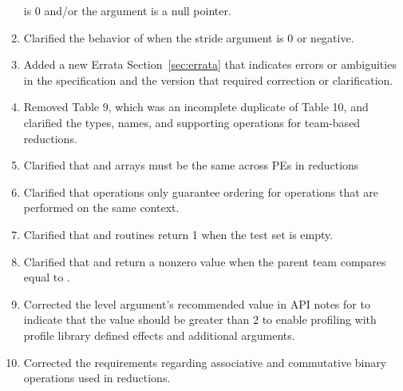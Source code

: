 \begin{enumerate}
     is 0 and/or the  argument is a null pointer.
%
\item Clarified the behavior of  when the
    stride argument is 0 or negative.
%
\item Added a new Errata Section~\ref{sec:errata} that indicates errors or ambiguities in the
    \openshmem specification and the version that required correction or clarification.
%
\item Removed \openshmem[1.5] Table 9, which was an incomplete duplicate of
    \openshmem[1.5] Table 10, and clarified the types, names, and supporting
    operations for team-based reductions. \label{changelog:reduction_table}
%
%
\item Clarified that  and  arrays must be the same
    across \acp{PE} in \openshmem reductions \label{changelog:reduction_args}
%
\item Clarified that  operations only guarantee ordering for
    operations that are performed on the same context. \label{changelog:fence_ctx}
%
%
\item Clarified that  and 
    routines return 1 when the test set is empty. \label{changelog:test_all}
%
%
\item Clarified that  and
     return a nonzero value when the parent
        team compares equal to . \label{changelog:split_strided_2d}
%
%
\item Corrected the level argument's recommended value in API notes for
     to indicate that the value should be greater than
    2 to enable profiling with profile library defined effects and
    additional arguments. \label{changelog:pcontrol}
%
\item Corrected the requirements regarding associative and commutative binary
    operations used in \openshmem reductions.
    \label{changelog:reduction_associativity}
%

\end{enumerate}

